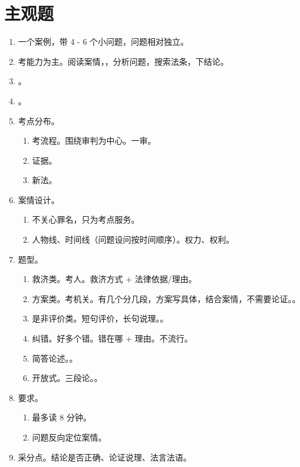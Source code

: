 \section{主观题}
\begin{enumerate}
  \item 一个案例，带 4 - 6 个小问题，问题相对独立。
  \item 考能力为主。阅读案情，，分析问题，搜索法条，下结论。
  \item {}。
  \item {}。
  \item 考点分布。
        \begin{enumerate}
          \item 考流程。围绕审判为中心。一审。
          \item 证据。
          \item 新法。
        \end{enumerate}
  \item 案情设计。
        \begin{enumerate}
          \item 不关心罪名，只为考点服务。
          \item 人物线、时间线（问题设问按时间顺序）。权力、权利。
        \end{enumerate}
  \item 题型。
        \begin{enumerate}
          \item 救济类。考人。救济方式 + 法律依据/理由。
          \item 方案类。考机关。有几个分几段，方案写具体，结合案情，不需要论证。。
          \item 是非评价类。短句评价，长句说理。。
          \item 纠错。好多个错。错在哪 + 理由。不流行。
          \item 简答论述。。
          \item 开放式。三段论。。
        \end{enumerate}
  \item 要求。
        \begin{enumerate}
          \item 最多读 8 分钟。
          \item 问题反向定位案情。
        \end{enumerate}
  \item 采分点。结论是否正确、论证说理、法言法语。

\end{enumerate}
